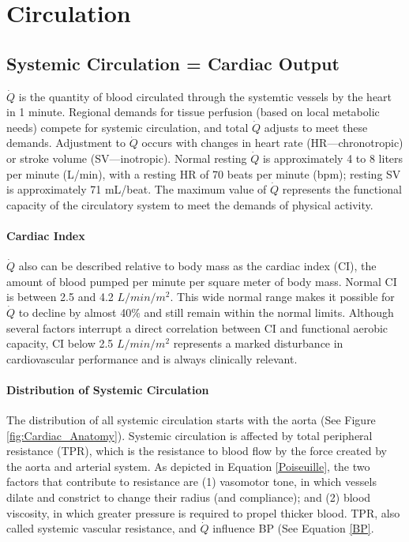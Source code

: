 \section{Circulation}

\subsection{Systemic Circulation = Cardiac Output}
$\dot{Q}$ is the quantity of blood circulated through the systemtic vessels by the heart in 1 minute. Regional demands for tissue perfusion (based on local metabolic needs) compete for systemic circulation, and total $\dot{Q}$ adjusts to meet these demands. Adjustment to $\dot{Q}$ occurs with changes in heart rate (HR—chronotropic) or stroke volume (SV—inotropic). Normal resting $\dot{Q}$ is approximately 4 to 8 liters per minute (L/min), with a resting HR of 70 beats per minute (bpm); resting SV is approximately 71 mL/beat. The maximum value of $\dot{Q}$ represents the functional capacity of the circulatory system to meet the demands of physical activity.

\paragraph{Cardiac Index}
$\dot{Q}$ also can be described relative to body mass as the cardiac index (CI), the amount of blood pumped per minute per square meter of body mass. Normal CI is between 2.5 and 4.2 $L/min/m^2$. This wide normal range makes it possible for $\dot{Q}$ to decline by almost 40\% and still remain within the normal limits. Although several factors interrupt a direct correlation between CI and functional aerobic capacity,  CI below 2.5 $L/min/m^2$ represents a marked disturbance in cardiovascular performance and is always clinically relevant.

\paragraph{Distribution of Systemic Circulation}
The distribution of all systemic circulation starts with the aorta (See Figure \ref{fig:Cardiac_Anatomy}). Systemic circulation is affected by total peripheral resistance (TPR), which is the resistance to blood flow by the force created by the aorta and arterial system. As depicted in Equation \ref{Poiseuille}, the two factors that contribute to resistance are (1) vasomotor tone, in which vessels dilate and constrict to change their radius (and compliance); and (2) blood viscosity, in which greater pressure is required to propel thicker blood. TPR, also called systemic vascular resistance, and $\dot{Q}$ influence BP (See Equation \ref{BP}. 


